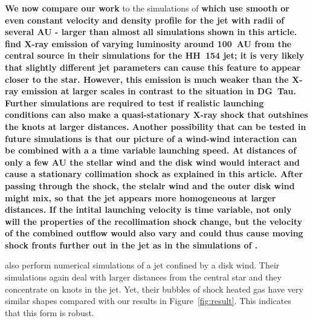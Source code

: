 \textbf{We now compare our work} to the simulations of \citet{2010A&A...511A..42B,2010A&A...517A..68B,2011ApJ...737...54B} \textbf{which use smooth or even constant velocity and density profile for the jet with radii of several AU - larger than almost all simulations shown in this article.  \citet{2010A&A...517A..68B} find X-ray emission of varying luminosity around 100~AU from the central source in their simulations for the HH~154 jet; it is very likely that slightly different jet parameters can cause this feature to appear closer to the star. However, this emission is much weaker than the X-ray emission at larger scales in contrast to the situation in DG~Tau. Further simulations are required to test if realistic launching conditions can also make a quasi-stationary X-ray shock that outshines the knots at larger distances. Another possibility that can be tested in future simulations is that our picture of a wind-wind interaction can be combined with a a time variable launching speed. At distances of only a few AU the stellar wind and the disk wind would interact and cause a stationary collimation shock as explained in this article. After passing through the shock, the stelalr wind and the outer disk wind might mix, so that the jet appears more homogeneous at larger distances. If the intital launching velocity is time variable, not only will the properties of the recollimation shock change, but the velocity of the combined outflow would also vary and could thus cause moving shock fronts further out in the jet as in the simulations of \citet{2010A&A...511A..42B,2010A&A...517A..68B}.}

\citet{2009A&A...502..217M,2012A&A...545A..53M} also perform numerical simulations of a jet confined by a disk wind. Their simulations again deal with larger distances from the central star and they concentrate on knots in the jet. Yet, their bubbles of shock heated gas have very similar shapes compared with our results in Figure~\ref{fig:result}. This indicates that this form is robust. 

